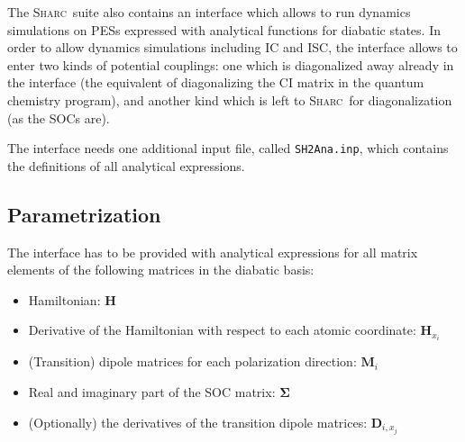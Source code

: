 \documentclass[a4paper,11pt,DIV=15,openany,twoside=false]{scrbook}
\newcommand{\sharc}{\textsc{Sharc}}
\newcommand{\ttt}[1]{\texttt{#1}}
\begin{document}
The \sharc\ suite also contains an interface which allows to run dynamics simulations on PESs expressed with analytical functions for diabatic states.
In order to allow dynamics simulations including IC and ISC, the interface allows to enter two kinds of potential couplings: one which is diagonalized away already in the interface (the equivalent of diagonalizing the CI matrix in the quantum chemistry program), and another kind which is left to \sharc\ for diagonalization (as the SOCs are).

The interface needs one additional input file, called \ttt{SH2Ana.inp}, which contains the definitions of all analytical expressions.

\subsection{Parametrization}

The interface has to be provided with analytical expressions for all matrix elements of the following matrices in the diabatic basis:
\begin{itemize}
  \item Hamiltonian: $\mathbf{H}$
  \item Derivative of the Hamiltonian with respect to each atomic coordinate: $\mathbf{H}_{x_i}$
  \item (Transition) dipole matrices for each polarization direction: $\mathbf{M}_i$
  \item Real and imaginary part of the SOC matrix: $\boldsymbol{\Sigma}$
  \item (Optionally) the derivatives of the transition dipole matrices: $\mathbf{D}_{i,x_j}$
\end{itemize}
\end{document}
